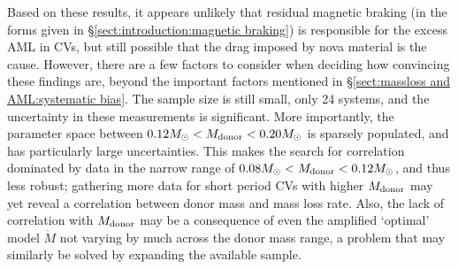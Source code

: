 Based on these results, it appears unlikely that residual magnetic braking (in the forms given in \S\ref{sect:introduction:magnetic braking}) is responsible for the excess AML in CVs, but still possible that the drag imposed by nova material is the cause.
However, there are a few factors to consider when deciding how convincing these findings are, beyond the important factors mentioned in \S\ref{sect:massloss and AML:systematic bias}.
The sample size is still small, only 24 systems, and the uncertainty in these measurements is significant.
More importantly, the parameter space between $0.12 M_\odot < M_{\rm donor} < 0.20 M_\odot$ is sparsely populated, and has particularly large uncertainties. This makes the search for correlation dominated by data in the narrow range of $0.08 M_\odot < M_{\rm donor} < 0.12 M_\odot$, and thus less robust; gathering more data for short period CVs with higher $M_{\rm donor}$ may yet reveal a correlation between donor mass and mass loss rate.
Also, the lack of correlation with $M_{\rm donor}$ may be a consequence of even the amplified `optimal' model $\dot M$ not varying by much across the donor mass range, a problem that may similarly be solved by expanding the available sample.
